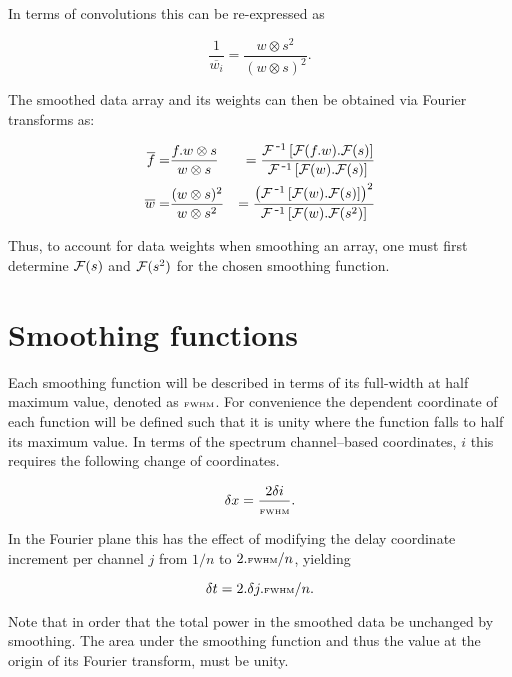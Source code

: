 \documentclass[12pt]{article}
\begin{document}
In terms of convolutions this can be re-expressed as

\begin{equation}
 \frac{1}{\overline{w_{i}}} = \frac {w \otimes s^{2} } {(w \otimes s)^2}.
\end{equation}

The smoothed data array and its weights can then be obtained via
Fourier transforms as:

\begin{eqnarray}
 \overline{f} =& \frac {f.w \otimes s} {w \otimes s} &= \frac{{\cal F}^{\mbox{\,-}1}\left[{\cal F}(f.w).{\cal F}(s)\right]} {{\cal F}^{\mbox{\,-}1}\left[{\cal F}(w).{\cal F}(s)\right]}\\
 \overline{w} =& \frac {(w \otimes s)^2}{w \otimes s^{2} } &= \frac{\left({\cal F}^{\mbox{\,-}1}\left[{\cal F}(w).{\cal F}(s)\right]\right)^2}{{\cal F}^{\mbox{\,-}1}\left[{\cal F}(w).{\cal F}(s^{2})\right]}
\end{eqnarray}

Thus, to account for data weights when smoothing an array, one must
first determine ${\cal F}(s)$ and ${\cal F}(s^2)$ for the chosen smoothing
function.

\section{Smoothing functions}

\def\fwhm{\mbox{\tiny FWHM}}

Each smoothing function will be described in terms of its full-width
at half maximum value, denoted as $\fwhm$. For convenience the
dependent coordinate of each function will be defined such that it is
unity where the function falls to half its maximum value. In terms of
the spectrum channel--based coordinates, $i$ this requires the
following change of coordinates.

\begin{equation}
  \delta x = \frac{2 \delta i}{\fwhm}.
\end{equation}

In the Fourier plane this has the effect of modifying the delay
coordinate increment per channel $j$ from $1/n$ to $2.\fwhm/n$,
yielding

\begin{equation}
  \delta t = 2.\delta j.\fwhm / n.
\end{equation}

Note that in order that the total power in the smoothed data be
unchanged by smoothing. The area under the smoothing function and thus
the value at the origin of its Fourier transform, must be unity.
\end{document}
